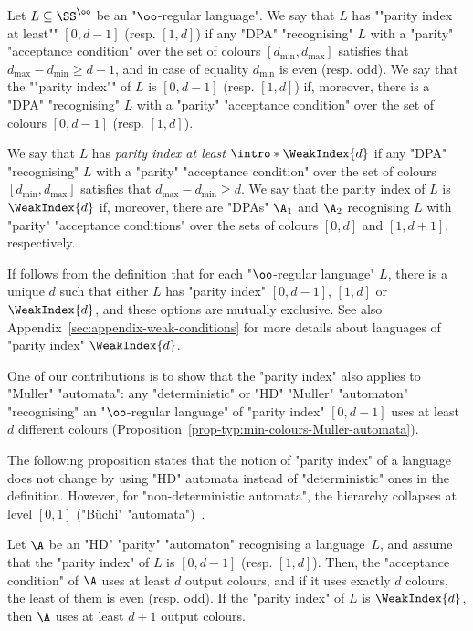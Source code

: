 \documentclass{theoretics}
\begin{document}
\begin{definition}\label{def:parity_index_language}
	Let $L\subseteq \SS^\oo$ be an "$\oo$-regular language". 
	\AP We say that $L$ has ""parity index at least"" $[0, d-1]$ (resp. $[1, d]$) if any "DPA" "recognising" $L$ with a "parity" "acceptance condition" over the set of colours $[d_{\min}, d_{\max}]$ satisfies that $d_{\max} - d_{\min} \geq d-1$, and in case of equality $d_{\min}$ is even (resp. odd).
	We say that the ""parity index"" of $L$ is $[0, d-1]$ (resp. $[1, d]$) if, moreover, there is a "DPA" "recognising" $L$ with a "parity" "acceptance condition" over the set of colours $[0,d-1]$ (resp. $[1,d]$). 
	
	\AP We say that $L$ has \emph{parity index at least} $\intro*\WeakIndex{d}$ if any "DPA" "recognising" $L$ with a "parity" "acceptance condition" over the set of colours $[d_{\min}, d_{\max}]$ satisfies that $d_{\max} - d_{\min} \geq d$. We say that the parity index of $L$ is $\WeakIndex{d}$ if, moreover, there are "DPAs" $\A_1$ and $\A_2$ recognising $L$ with "parity" "acceptance conditions" over the sets of colours $[0,d]$ and $[1,d+1]$, respectively.  
	
\end{definition}

If follows from the definition that for each "$\oo$-regular language" $L$, there is a unique $d$ such that either $L$ has "parity index" $[0,d-1]$, $[1,d]$ or $\WeakIndex{d}$, and these options are mutually exclusive. See also Appendix~\ref{sec:appendix-weak-conditions} for more details about languages of "parity index" $\WeakIndex{d}$.

One of our contributions is to show that the "parity index" also applies to "Muller" "automata": any "deterministic" or "HD" "Muller" "automaton" "recognising" an "$\oo$-regular language" of "parity index" $[0, d-1]$ uses at least $d$ different colours (Proposition~\ref{prop-typ:min-colours-Muller-automata}).

The following proposition states that the notion of "parity index" of a language does not change by using "HD" automata instead of "deterministic" ones in the definition.
However, for "non-deterministic automata", the hierarchy collapses at level $[0,1]$ ("Büchi" "automata")~\cite{McNaughton1966Testing}.


\begin{proposition}\label{prop-prelim:parity_index-HDAutomata}
	Let $\A$ be an "HD" "parity" "automaton" recognising a language~$L$, and assume that the "parity index" of $L$ is $[0,d-1]$ (resp. $[1,d]$). Then, the "acceptance condition" of $\A$ uses at least $d$ output colours, and if it uses exactly $d$ colours, the least of them is even (resp. odd). If the "parity index" of $L$ is $\WeakIndex{d}$, then $\A$ uses at least $d+1$ output colours.
\end{proposition}
\end{document}
